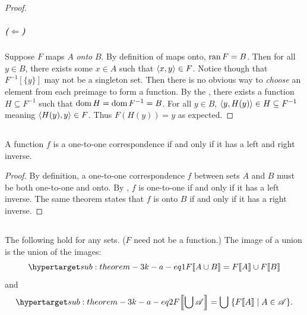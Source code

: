 \documentclass{report}
\begin{document}
\begin{proof}
      \subparagraph{($\Leftarrow$)}%

        Suppose $F$ maps $A$ \textit{onto} $B$.
        By definition of maps onto, $\mathop{\text{ran}}{F} = B$.
        Then for all $y \in B$, there exists some $x \in A$ such that
          $\left< x, y \right> \in F$.
        Notice though that $F^{-1}[\{y\}]$ may not be a singleton set.
        Then there is no obvious way to \textit{choose} an element from each
          preimage to form a function.
        By the , there exists a function
          $H \subseteq F^{-1}$ such that $\mathop{\text{dom}}{H} = \mathop{\text{dom}}{F^{-1}} = B$.
        For all $y \in B$, $\left< y, H(y) \right> \in H \subseteq F^{-1}$
          meaning $\left< H(y), y \right> \in F$.
        Thus $F(H(y)) = y$ as expected.

  \end{proof}

\subsection{}%

  \begin{corollary}
    A function $f$ is a one-to-one correspondence if and only if it has a left
      and right inverse.
  \end{corollary}

  \begin{proof}
    By definition, a one-to-one correspondence $f$ between sets $A$ and $B$ must
      be both one-to-one and onto.
    By , $f$ is one-to-one if and only if it has a left
      inverse.
    The same theorem states that $f$ is onto $B$ if and only if it has a right
      inverse.
  \end{proof}

\subsection{}%

  \begin{theorem}[3K(a)]
    The following hold for any sets. ($F$ need not be a function.)
    The image of a union is the union of the images:
      \begin{equation}
        \hyperlabel{sub:theorem-3k-a-eq1}
        \img{F}{A \cup B} = \img{F}{A} \cup \img{F}{B}
      \end{equation}
      and
      \begin{equation}
        \hyperlabel{sub:theorem-3k-a-eq2}
        \img{F}{\bigcup{\mathscr{A}}} =
          \bigcup\;\{\img{F}{A} \mid A \in \mathscr{A}\}.
      \end{equation}
  \end{theorem}
\end{document}
